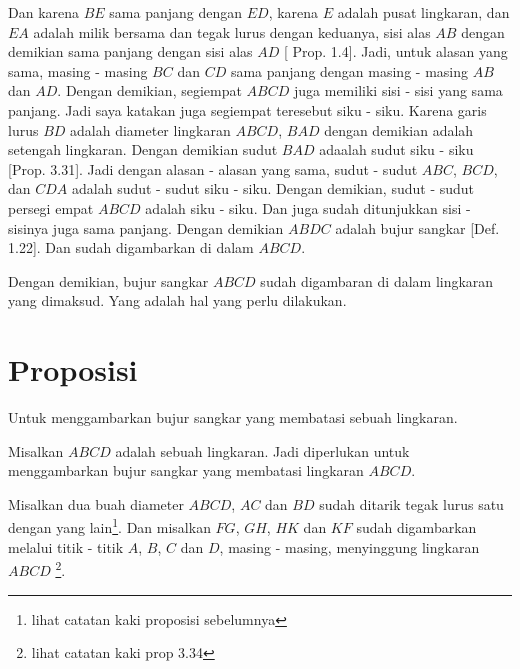 \documentclass[a4paper]{book}
\begin{document}
Dan karena $BE$ sama panjang dengan $ED$, karena $E$ adalah pusat 
lingkaran, dan $EA$ adalah milik bersama dan tegak lurus dengan keduanya, 
sisi alas $AB$ dengan demikian sama panjang dengan sisi alas $AD$ [
Prop. 1.4]. Jadi, untuk alasan yang sama, masing - masing $BC$ dan $CD$ 
sama panjang dengan masing - masing $AB$ dan $AD$. Dengan demikian, 
segiempat $ABCD$ juga memiliki sisi - sisi yang sama panjang. Jadi saya
katakan juga segiempat teresebut siku - siku. Karena garis lurus
$BD$ adalah diameter lingkaran $ABCD$, $BAD$ dengan demikian adalah 
setengah lingkaran. Dengan demikian sudut $BAD$ adaalah sudut siku - siku
[Prop. 3.31]. Jadi dengan alasan - alasan yang sama, sudut - sudut $ABC$,
$BCD$, dan $CDA$ adalah sudut - sudut siku - siku. Dengan demikian, 
sudut - sudut persegi empat $ABCD$ adalah siku - siku. Dan juga sudah 
ditunjukkan sisi - sisinya juga sama panjang. Dengan demikian $ABDC$ adalah
bujur sangkar [Def. 1.22]. Dan sudah digambarkan di dalam $ABCD$.

Dengan demikian, bujur sangkar $ABCD$ sudah digambaran di dalam lingkaran
yang dimaksud. Yang adalah hal yang perlu dilakukan.

\section*{\centering Proposisi \thesection}
Untuk menggambarkan bujur sangkar yang membatasi sebuah lingkaran.
\begin{center} 
\end{center} 
Misalkan $ABCD$ adalah sebuah lingkaran. Jadi diperlukan untuk menggambarkan
bujur sangkar yang membatasi lingkaran $ABCD$.

Misalkan dua buah diameter $ABCD$, $AC$ dan $BD$ sudah ditarik tegak lurus
satu dengan yang lain\footnote{lihat catatan kaki proposisi sebelumnya}. Dan 
misalkan $FG$, $GH$, $HK$ dan $KF$ sudah digambarkan melalui titik - titik
$A$, $B$, $C$ dan $D$, masing - masing, menyinggung lingkaran $ABCD$ 
\footnote{lihat catatan kaki prop 3.34}.
\end{document}
